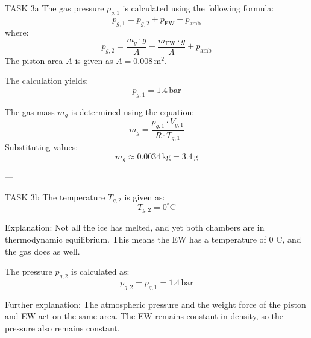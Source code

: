 TASK 3a  
The gas pressure \( p_{g,1} \) is calculated using the following formula:  
\[
p_{g,1} = p_{g,2} + p_{\text{EW}} + p_{\text{amb}}
\]  
where:  
\[
p_{g,2} = \frac{m_g \cdot g}{A} + \frac{m_{\text{EW}} \cdot g}{A} + p_{\text{amb}}
\]  
The piston area \( A \) is given as \( A = 0.008 \, \text{m}^2 \).  

The calculation yields:  
\[
p_{g,1} = 1.4 \, \text{bar}
\]  

The gas mass \( m_g \) is determined using the equation:  
\[
m_g = \frac{p_{g,1} \cdot V_{g,1}}{R \cdot T_{g,1}}
\]  
Substituting values:  
\[
m_g \approx 0.0034 \, \text{kg} = 3.4 \, \text{g}
\]  

---

TASK 3b  
The temperature \( T_{g,2} \) is given as:  
\[
T_{g,2} = 0^\circ\text{C}
\]  

Explanation: Not all the ice has melted, and yet both chambers are in thermodynamic equilibrium. This means the EW has a temperature of \( 0^\circ\text{C} \), and the gas does as well.  

The pressure \( p_{g,2} \) is calculated as:  
\[
p_{g,2} = p_{g,1} = 1.4 \, \text{bar}
\]  

Further explanation: The atmospheric pressure and the weight force of the piston and EW act on the same area. The EW remains constant in density, so the pressure also remains constant.